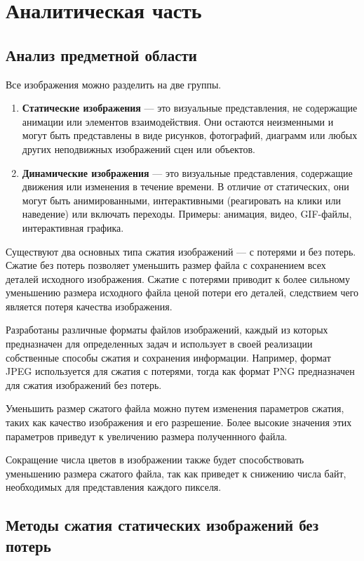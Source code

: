 \chapter{Аналитическая часть}

\section{Анализ предметной области}

Все изображения можно разделить на две группы.
\begin{enumerate}
    \item \textbf{Статические изображения} --- это визуальные представления, не содержащие анимации или элементов взаимодействия. Они остаются неизменными и могут быть представлены в виде рисунков, фотографий, диаграмм или любых других неподвижных изображений сцен или объектов.
    \item \textbf{Динамические изображения} --- это визуальные представления, содержащие движения или изменения в течение времени. В отличие от статических, они могут быть анимированными, интерактивными (реагировать на клики или наведение) или включать переходы. Примеры: анимация, видео, GIF-файлы, интерактивная графика.
\end{enumerate}

Существуют два основных типа сжатия изображений --- с потерями и без потерь. Сжатие без потерь позволяет уменьшить размер файла с сохранением всех деталей исходного изображения. Сжатие с потерями приводит к более сильному уменьшению размера исходного файла ценой потери его деталей, следствием чего является потеря качества изображения.

Разработаны различные форматы файлов изображений, каждый из которых предназначен для определенных задач и использует в своей реализации собственные способы сжатия и сохранения информации. Например, формат JPEG используется для сжатия с потерями, тогда как формат PNG предназначен для сжатия изображений без потерь.

Уменьшить размер сжатого файла можно путем изменения параметров сжатия, таких как качество изображения и его разрешение. 
Более высокие значения этих параметров приведут к увеличению размера полученнного файла.

Сокращение числа цветов в изображении также будет способствовать уменьшению размера сжатого файла, так как приведет к снижению числа байт, необходимых для представления каждого пикселя.


\section{Методы сжатия статических изображений без потерь}

